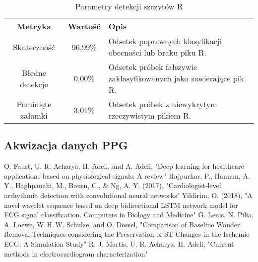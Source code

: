 \documentclass[journal]{IEEEtran}
\begin{document}
\begin{table}[ht]
\centering
\caption{Parametry detekcji szczytów R}
\label{tab:metrics}
\begin{tabular}{|c|c|p{4.6cm}|}
\hline
\textbf{Metryka} & \textbf{Wartość} & \textbf{Opis} \\
\hline
Skuteczność & 96,99\% & Odsetek poprawnych klasyfikacji obecności lub braku piku R. \\
\hline
Błędne detekcje & 0,00\% & Odsetek próbek fałszywie zaklasyfikowanych jako zawierające pik R. \\
\hline
Pominięte załamki & 3,01\% & Odsetek próbek z niewykrytym rzeczywistym pikiem R. \\
\hline
\end{tabular}
\end{table}


\subsection{Akwizacja danych PPG}




\begin{thebibliography}{1}
 O. Faust, U. R. Acharya, H. Adeli, and A. Adeli, "Deep learning for healthcare applications based on physiological signals: A review"
 Rajpurkar, P., Hannun, A. Y., Haghpanahi, M., Bourn, C., & Ng, A. Y. (2017), "Cardiologist-level arrhythmia detection with convolutional neural networks"
 Yildirim, O. (2018), "A novel wavelet sequence based on deep bidirectional LSTM network model for ECG signal classification. Computers in Biology and Medicine"
 G. Lenis, N. Pilia, A. Loewe, W. H. W. Schulze, and O. Dössel, "Comparison of Baseline Wander Removal Techniques considering the Preservation of ST Changes in the Ischemic ECG: A Simulation Study"
 R. J. Martis, U. R. Acharya, H. Adeli, "Current methods in electrocardiogram characterization"

\end{thebibliography}
\end{document}
